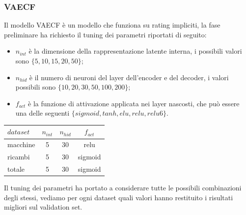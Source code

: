 \subsubsection{VAECF}
Il modello VAECF è un modello che funziona su rating impliciti, la fase preliminare ha richiesto il tuning dei parametri riportati di seguito:
\begin{itemize}
    \item $n_{int}$ è la dimensione della rappresentazione latente interna, i possibili valori sono $\{5,10,15,20,50\}$;
    \item $n_{hid}$ è il numero di neuroni del layer dell'encoder e del decoder, i valori possibili sono $\{10,20,30,50,100,200\}$;
    \item $f_{act}$ è la funzione di attivazione applicata nei layer nascosti, che può essere una delle seguenti $\{sigmoid, tanh, elu, relu, relu6\}$.
\end{itemize}
\begin{minipage}[H]{0.45\textwidth}
    \begin{center}
        \begin{tabular}{|l|ccc|}
            \toprule
            $dataset$ &    $n_{int}$ &  $n_{hid}$ & $f_{act}$ \\
            \midrule
            macchine & 5 & 30 & relu \\
            ricambi  &	5 & 30 & sigmoid\\
            totale  & 5 & 30 & sigmoid\\
        \bottomrule
        \end{tabular}
        \label{tab:tuning_vaecf}
\end{center}
\end{minipage}
\begin{minipage}[H]{0.55\textwidth}
    Il tuning dei parametri ha portato a considerare tutte le possibili combinazioni degli stessi, vediamo per ogni dataset quali valori hanno restituito i risultati migliori sul validation set.
\end{minipage}\\

